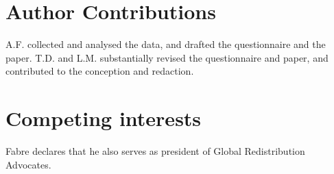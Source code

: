 \begin{bibunit}
\begin{small}
\section*{\normalsize Author Contributions} A.F. collected and analysed the data, and drafted the questionnaire and the paper. T.D. and L.M. substantially revised the questionnaire and paper, and contributed to the conception and redaction.

\section*{\normalsize Competing interests} Fabre declares that he also serves as president of Global Redistribution Advocates. %




\end{small}  %

\begin{table}[h]
  \caption[List experiment: tacit support for the GCS]{Number of supported policies in the list experiment depending on the presence of the Global Climate Scheme (GCS) in the list. %
   The tacit support for the GCS is estimated by regressing the number of supported policies on the presence of the GCS in the list of policies. The social desirability is estimated as the difference between the tacit and stated support, and it is not significantly different from zero even at a 20\% threshold (see ).
  }\label{tab:list_exp}
  \makebox[\textwidth][c]{
  }  
\end{table}


\end{bibunit}
